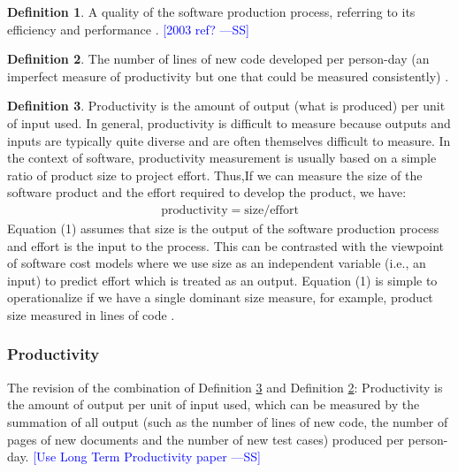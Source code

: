 \documentclass[letterpaper, cleveref]{lipics-v2019}
\newcommand{\authornote}[3]{\textcolor{#1}{[#3 ---#2]}}
\newcommand{\authornote}[3]{}
\newcommand{\wss}[1]{\authornote{blue}{SS}{#1}} %
\theoremstyle{definition}
\newtheorem{defn}{Definition}
\begin{document}
\begin{defn}
  A quality of the software production process, referring to its efficiency
  and performance \citep{ghezzi1991fundamentals}.  \wss{2003 ref?}
\end{defn}

\begin{defn}
	\label{ProductivitySelected2} The number of lines of new code developed per
  person-day (an imperfect measure of productivity but one that could be
  measured consistently) \citep{MacCormack2003}.
\end{defn}

\begin{defn}
	\label{ProductivitySelected1} Productivity is the amount of output (what is
  produced) per unit of input used. In general, productivity is difficult to
  measure because outputs and inputs are typically quite diverse and are
  often themselves difficult to measure. In the context of software,
  productivity measurement is usually based on a simple ratio of product
  size to project effort. Thus,If we can measure the size of the software
  product and the effort required to develop the product, we have:
	\begin{align}
	\text{productivity} = \text{size}/\text{effort}
	\end{align}
  Equation (1) assumes that size is the output of the software production
  process and effort is the input to the process. This can be contrasted
  with the viewpoint of software cost models where we use size as an
  independent variable (i.e., an input) to predict effort which is treated
  as an output. Equation (1) is simple to operationalize if we have a single
  dominant size measure, for example, product size measured in lines of code
  \citep{Kitchenham2004}.
\end{defn}

\begin{mybox}
\subsubsection*{Productivity}
The revision of the combination of Definition \ref{ProductivitySelected1}
and Definition \ref{ProductivitySelected2}: Productivity is the amount of
output per unit of input used, which can be measured by the summation of all
output (such as the number of lines of new code, the number of pages of new
documents and the number of new test cases) produced per person-day.
\wss{Use Long Term Productivity paper}
\end{mybox}
\end{document}
